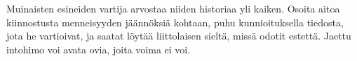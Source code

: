\documentclass{article}
\begin{document}
\begin{infobox}
Muinaisten esineiden vartija arvostaa niiden historiaa yli kaiken. Osoita aitoa kiinnostusta menneisyyden jäännöksiä kohtaan, puhu kunnioituksella tiedosta, jota he vartioivat, ja saatat löytää liittolaisen sieltä, missä odotit estettä. Jaettu intohimo voi avata ovia, joita voima ei voi.
\end{infobox}
\end{document}
